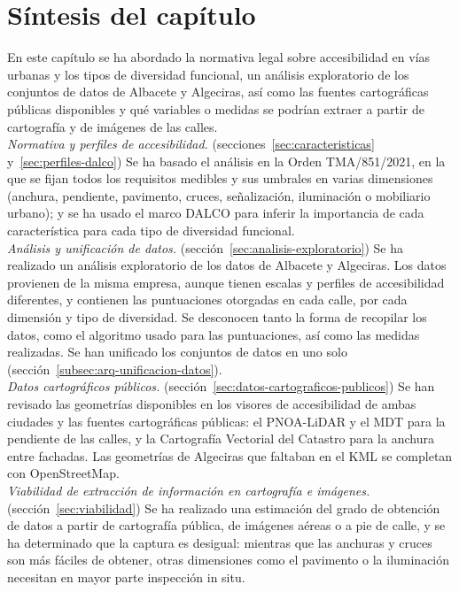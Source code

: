 \section{Síntesis del capítulo}
\label{sec:sintesis-marco}

En este capítulo se ha abordado la normativa legal sobre accesibilidad en vías urbanas y los tipos de diversidad funcional, un análisis exploratorio de los conjuntos de datos de Albacete y Algeciras, así como las fuentes cartográficas públicas disponibles y qué variables o medidas se podrían extraer a partir de cartografía y de imágenes de las calles.
\\

\textit{Normativa y perfiles de accesibilidad.} (secciones~\ref{sec:caracteristicas} y~\ref{sec:perfiles-dalco}) Se ha basado el análisis en la Orden TMA/851/2021, en la que se fijan todos los requisitos medibles y sus umbrales en varias dimensiones (anchura, pendiente, pavimento, cruces, señalización, iluminación o mobiliario urbano); y se ha usado el marco DALCO para inferir la importancia de cada característica para cada tipo de diversidad funcional.
\\

\textit{Análisis y unificación de datos.} (sección~\ref{sec:analisis-exploratorio}) Se ha realizado un análisis exploratorio de los datos de Albacete y Algeciras. Los datos provienen de la misma empresa, aunque tienen escalas y perfiles de accesibilidad diferentes, y contienen las puntuaciones otorgadas en cada calle, por cada dimensión y tipo de diversidad. Se desconocen tanto la forma de recopilar los datos, como el algoritmo usado para las puntuaciones, así como las medidas realizadas. Se han unificado los conjuntos de datos en uno solo (sección~\ref{subsec:arq-unificacion-datos}).
\\

\textit{Datos cartográficos públicos.} (sección~\ref{sec:datos-cartograficos-publicos}) Se han revisado las geometrías disponibles en los visores de accesibilidad de ambas ciudades y las fuentes cartográficas públicas: el PNOA-LiDAR y el MDT para la pendiente de las calles, y la Cartografía Vectorial del Catastro para la anchura entre fachadas. Las geometrías de Algeciras que faltaban en el KML se completan con OpenStreetMap.
\\

\textit{Viabilidad de extracción de información en cartografía e imágenes.} (sección~\ref{sec:viabilidad}) Se ha realizado una estimación del grado de obtención de datos a partir de cartografía pública, de imágenes aéreas o a pie de calle, y se ha determinado que la captura es desigual: mientras que las anchuras y cruces son más fáciles de obtener, otras dimensiones como el pavimento o la iluminación necesitan en mayor parte inspección in situ.
\\

